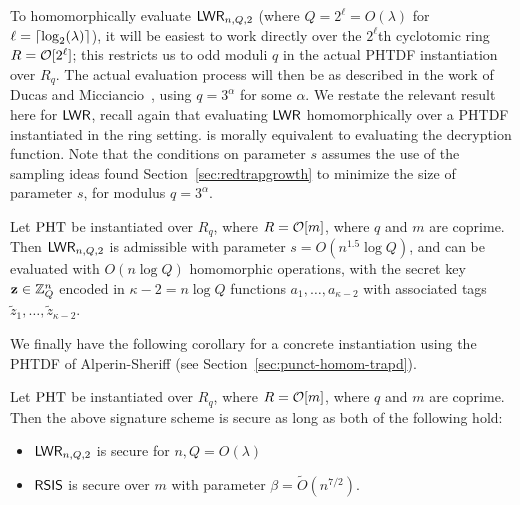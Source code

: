 To homomorphically evaluate $\mathsf{LWR}_{n,Q,2}$ (where $Q=2^{\ell}=O(\lambda)$ for
$\ell=\lceil\log_2(\lambda)\rceil$), it will be easiest to work directly over the $2^{\ell}$th cyclotomic
ring $R=\mathcal{O}[2^{\ell}]$; this restricts us to odd moduli $q$ in the
actual PHTDF instantiation over $R_q$. The actual evaluation process will then
be as described in the work of Ducas and
Micciancio~\cite{DBLP:conf/eurocrypt/DucasM15}, using $q=3^\alpha$ for
some $\alpha$. We restate the
relevant result here for $\mathsf{LWR}$, recall again that evaluating $\mathsf{LWR}$
homomorphically 
over a PHTDF instantiated in the ring setting.
is morally equivalent to evaluating the decryption function. Note that
the conditions on parameter $s$ assumes the use of the  sampling ideas
found Section~\ref{sec:redtrapgrowth} to minimize the size of
parameter $s$, for modulus $q=3^{\alpha}$. 
\begin{theorem} Let $\text{PHT}$ be
  instantiated over $R_q$, where $R=\mathcal{O}[m]$, where $q$ and $m$ are
  coprime. Then $\mathsf{LWR}_{n,Q,2}$ is
  admissible with parameter $s=O(n^{1.5}\log{Q})$, and can be
  evaluated with $O(n\log{Q})$ homomorphic operations, with the secret
  key $\mathbf{z} \in \mathbb{Z}_Q^{n}$ encoded in $\kappa-2=n\log{Q}$ functions
  $a_1, \ldots, a_{\kappa-2}$ with associated tags $\tilde{z}_1,
  \ldots, \tilde{z}_{\kappa-2}$. 
\end{theorem}

We finally have the following corollary for a concrete instantiation
using the PHTDF of Alperin-Sheriff (see
Section~\ref{sec:punct-homom-trapd}). 

\begin{corollary} Let $\text{PHT}$ be
  instantiated over $R_q$, where $R=\mathcal{O}[m]$, where $q$ and $m$ are
  coprime. Then the above signature scheme is secure as long as both
  of the following hold:
\begin{itemize}
\item  $\mathsf{LWR}_{n,Q,2}$ is secure for $n,Q=O(\lambda)$
\item $\mathsf{RSIS}$ is secure over $m$ with parameter
  $\beta=\tilde{O}(n^{7/2})$.
\end{itemize}
\end{corollary}



